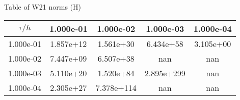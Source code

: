 \begin{center}
Table of W21 norms (H)
\\[2.0ex]  
  
\begin{tabular}{|c|c|c|c|c|} \hline
$\tau / h$ &1.000e-01 &1.000e-02 &1.000e-03 &1.000e-04 \\ \hline 
1.000e-01 &1.857e+12 &1.561e+30 &6.434e+58 &3.105e+00 \\ \hline 
1.000e-02 &7.447e+09 &6.507e+38 &nan &nan \\ \hline 
1.000e-03 &5.110e+20 &1.520e+84 &2.895e+299 &nan \\ \hline 
1.000e-04 &2.305e+27 &7.378e+114 &nan &nan \\ \hline 

\end{tabular}\\[20pt]
\end{center}
